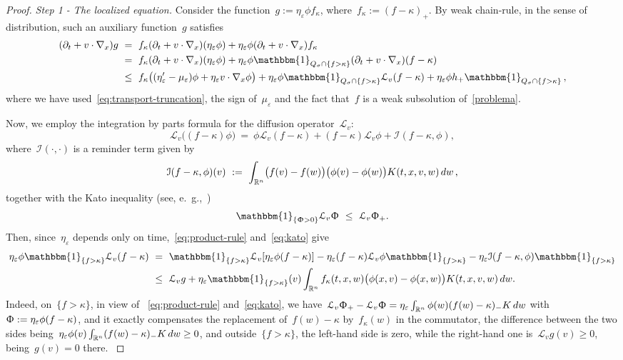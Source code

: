 \documentclass[leqno,10pt]{amsart}
\theoremstyle{plain}
\theoremstyle{remark}
\numberwithin{equation}{section}
\def\dw{\,{\rm d}w}
\def\ern{\mathbb{R}^n}
\newcommand{\Ic}{\mathcal{I}}
\newcommand{\Lc}{\mathcal{L}_v}
\newcommand{\kk}{\kappa}
\newcommand{\eps}{\varepsilon}
\begin{document}
{\begin{proof}
  \medskip
  {\it Step 1 - The localized equation.} Consider the function~$g:=\eta_\eps\phi f_\kk$, where~$f_\kk :=(f-\kk)_+$. By weak chain-rule, in the sense of distribution, such an auxiliary function~$g$ satisfies
  \[
  \begin{aligned}
  (\partial_t+v\cdot\nabla_x)g & \ = \ f_\kk(\partial_t+v\cdot\nabla_x)(\eta_\eps\phi) +\eta_\eps\phi(\partial_t+v\cdot\nabla_x)f_\kk\\
  & \ = \ f_\kk(\partial_t+v\cdot\nabla_x)(\eta_\eps\phi)+\eta_\eps\phi\mathbbm{1}_{Q_{\sigma}\cap \{f>\kk\}}(\partial_t+v\cdot\nabla_x)(f-\kk)\\
 & \ \leq \ f_\kk \bigl((\eta_\eps'-\mu_\eps)\phi+\eta_\eps v\cdot\nabla_x\phi\bigr)
 +\eta_\eps\phi\mathbbm{1}_{Q_{\sigma}\cap\{f>\kk\}}\Lc(f-\kk) +\eta_\eps\phi h_+\mathbbm{1}_{Q_{\sigma}\cap \{f>\kk\}}\,,
\end{aligned}
\]
 where we have used~\eqref{eq:transport-truncation}, the sign of~$\mu_\eps$ and the fact that~$f$ is a weak subsolution of~\eqref{problema}.

 Now, we employ the integration by parts formula for the diffusion operator~$\Lc$:
 \begin{equation}\label{eq:product-rule}
 \Lc \big((f-\kk)\phi\big) \ = \ \phi\Lc(f-\kappa) + (f-\kk)\Lc\phi+\Ic(f-\kappa,\phi),
 \end{equation}
 where~$\Ic(\cdot,\cdot)$ is a reminder term given by
 \begin{equation}\label{eq:kato}
 \Ic(f-\kk,\phi)(v) \ := \ \int_{\ern}\bigl(f(v)-f(w)\bigr)\bigl(\phi(v)-\phi(w)\bigr)K(t,x,v,w)\dw\,,
 \end{equation}
  together with the Kato inequality (see, e.~\!g.,~\cite{CS18})
  \[
  \mathbbm{1}_{\{\Upphi>0\}}\Lc\Upphi \ \leq \ \Lc\Upphi_+.
  \]
  Then, since~$\eta_\eps$ depends only on time,~\eqref{eq:product-rule} and~\eqref{eq:kato} give
  \[
  \begin{aligned}
   \eta_\eps\phi\mathbbm{1}_{\{f>\kk\}}\Lc(f-\kk) & \ = \
  \mathbbm{1}_{\{f>\kk\}}\Lc[\eta_\eps\phi(f-\kk)]-\eta_\eps(f-\kk)\Lc\phi\mathbbm{1}_{\{f>\kk\}} -\eta_\eps\Ic(f-\kk,\phi)\mathbbm{1}_{\{f>\kk\}}\\
  & \ \leq \ \Lc g +\eta_\eps\mathbbm{1}_{\{f>\kk\}}(v)
  \int_{\ern}f_\kk(t,x,w)\bigl(\phi(x,v)-\phi(x,w)\bigr)K(t,x,v,w)\dw.
  \end{aligned}
  \]
  {
  Indeed, on~$\{f>\kk\}$, in view of ~\eqref{eq:product-rule} and~\eqref{eq:kato}, we have~$\Lc\Upphi_+-\Lc\Upphi=\eta_\eps\int_{\ern}\phi(w)(f(w)-\kk)_-K\dw$ with~$\Upphi:=\eta_\eps\phi(f-\kk)$, and it exactly compensates the replacement of~$f(w)-\kk$ by~$f_\kk(w)$ in the commutator, the difference between the two sides being~$\eta_\eps\phi(v)\int_{\ern}(f(w)-\kk)_-K\dw\geq0$, and outside~$\{f>\kk\}$, the left-hand side is zero, while the right-hand one is~$\Lc g(v) \geq 0$, being~$g(v)=0$ there. 
  }
  

\end{proof}}
\end{document}
